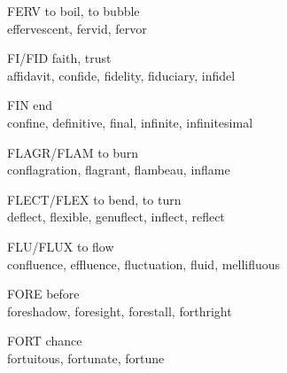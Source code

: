 \begin{flashcard}[Roots]{FERV}
to boil, to bubble\\
\vspace{0.2in}
effervescent, fervid, fervor\\
\end{flashcard}

\begin{flashcard}[Roots]{FI/FID}
faith, trust\\
\vspace{0.2in}
affidavit, confide, fidelity, fiduciary, infidel\\
\end{flashcard}

\begin{flashcard}[Roots]{FIN}
end\\
\vspace{0.2in}
confine, definitive, final, infinite, infinitesimal\\
\end{flashcard}

\begin{flashcard}[Roots]{FLAGR/FLAM}
to burn\\
\vspace{0.2in}
conflagration, flagrant, flambeau, inflame\\
\end{flashcard}

\begin{flashcard}[Roots]{FLECT/FLEX}
to bend, to turn\\
\vspace{0.2in}
deflect, flexible, genuflect, inflect, reflect\\
\end{flashcard}

\begin{flashcard}[Roots]{FLU/FLUX}
to flow\\
\vspace{0.2in}
confluence, effluence, fluctuation, fluid, mellifluous\\
\end{flashcard}

\begin{flashcard}[Roots]{FORE}
before\\
\vspace{0.2in}
foreshadow, foresight, forestall, forthright\\
\end{flashcard}

\begin{flashcard}[Roots]{FORT}
chance\\
\vspace{0.2in}
fortuitous, fortunate, fortune\\
\end{flashcard}

